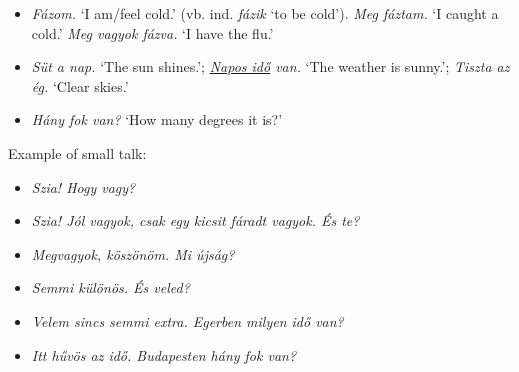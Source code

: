\documentclass[a4paper,11pt]{article}
\begin{document}
\begin{itemize}
  \item \emph{Fázom.} `I am/feel cold.' (vb. ind. \emph{fázik} `to be
    cold'). \emph{Meg fáztam.} `I caught a cold.' \emph{Meg vagyok
    fázva.} `I have the flu.'

  \item \emph{Süt a nap.} `The sun shines.'; \emph{\underline{Napos
    idő} van.}  `The weather is sunny.'; \emph{Tiszta az ég.} `Clear
    skies.'

  \item \emph{Hány fok van?} `How many degrees it is?'

\end{itemize}

\newpage

\noindent Example of small talk:

\begin{itemize}

  \item[---] \emph{Szia! Hogy vagy?}

  \item[---] \emph{Szia! Jól vagyok, csak egy kicsit fáradt vagyok. És
  te?}

  \item[---] \emph{Megvagyok, köszönöm. Mi újság?}

  \item[---] \emph{Semmi különös. És veled?}

  \item[---] \emph{Velem sincs semmi extra. Egerben milyen idő van?}

  \item[---] \emph{Itt hűvös az idő. Budapesten hány fok van?}

\end{itemize}
\end{document}
